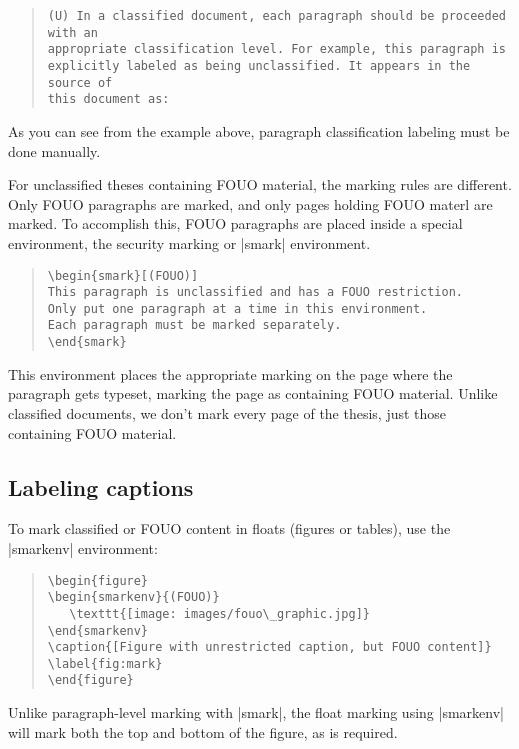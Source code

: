 \begin{quotation}
\begin{Verbatim}[fontsize=\small]
(U) In a classified document, each paragraph should be proceeded with an
appropriate classification level. For example, this paragraph is
explicitly labeled as being unclassified. It appears in the source of
this document as:
\end{Verbatim}
\end{quotation}

As you can see from the example above, paragraph classification
labeling must be done manually.

For unclassified theses containing FOUO material, the marking rules are different.
Only FOUO paragraphs are marked, and only pages holding FOUO materl are marked.
To accomplish this, FOUO paragraphs are placed inside a special
environment, the security marking or |smark| environment.
\begin{quotation}
\begin{Verbatim}[fontsize=\small]
\begin{smark}[(FOUO)]
This paragraph is unclassified and has a FOUO restriction.
Only put one paragraph at a time in this environment.
Each paragraph must be marked separately.
\end{smark}
\end{Verbatim}
\end{quotation}

This environment places the appropriate marking on the page where
the paragraph gets typeset, marking the page as containing FOUO material. 
Unlike classified documents, we don't mark every page of the thesis, just
those containing FOUO material. 

\subsection{Labeling captions}
To mark classified or FOUO content in floats (figures or tables), use
the |smarkenv| environment:

\begin{quotation}
\begin{Verbatim}[fontsize=\small]
\begin{figure}
\begin{smarkenv}{(FOUO)}
   \texttt{[image: images/fouo\_graphic.jpg]}
\end{smarkenv}
\caption{[Figure with unrestricted caption, but FOUO content]}
\label{fig:mark}
\end{figure}
\end{Verbatim}
\end{quotation}
Unlike paragraph-level marking with |smark|, the float marking using |smarkenv| 
will mark both the top and bottom of the figure, as is required.

